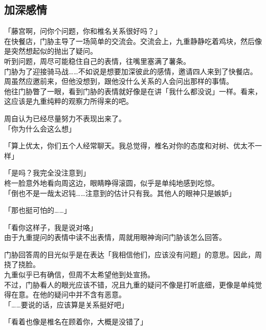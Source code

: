 \subsection{加深感情}

「藤宫啊，问你个问题，你和椎名关系很好吗？」\\

在快餐店，门胁主导了一场简单的交流会。交流会上，九重静静吃着鸡块，然后像是突然想起似的抛出了疑问。\\

听到问题，周尽可能稳住自己的表情，往嘴里塞满了薯条。\\

门胁为了迎接骑马战……不如说是想要加深彼此的感情，邀请四人来到了快餐店。周虽然应邀前来，但他没想到，跟他没什么关系的人会问出那样的事情。\\

他往门胁瞥了一眼，看到门胁的表情就好像是在讲「我什么都没说」一样。看来，这应该是九重纯粹的观察力所得来的吧。

周自认为已经尽量努力不表现出来了。\\

「你为什么会这么想」

「算上优太，你们五个人经常聊天。我总觉得，椎名对你的态度和对树、优太不一样」

「是吗？我完全没注意到」\\

柊一脸意外地看向周这边，眼睛睁得滚圆，似乎是单纯地感到吃惊。\\

「倒也不是一哉太迟钝……注意到的估计只有我。其他人的眼神只是嫉妒」

「那也挺可怕的……」

「看你这样子，我是说对咯」\\

由于九重提问的表情中读不出表情，周就用眼神询问门胁该怎么回答。

门胁回答周的目光似乎是在表达「我相信他们，应该没有问题」的意思。因此，周挠了挠脸。\\

九重似乎已有确信，但周不太希望他到处宣扬。\\

不过，门胁看人的眼光应该不错，况且九重的疑问不像是打听底细，更像是单纯觉得在意。在他的疑问中并不含有恶意。\\

「……要说的话，应该算是关系挺好吧」

「看着也像是椎名在顾着你，大概是没错了」

